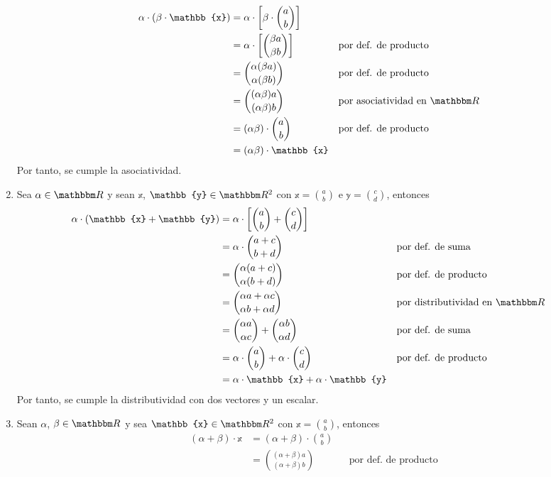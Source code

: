 \begin{example}
\begin{enumerate}[label=\roman*)]
        \begin{align*}
            \alpha \cdot (\beta \cdot \mathbb{x}) & = \alpha \cdot \left[ \beta \cdot \binom{a}{b} \right] \\
            & = \alpha \cdot \left[ \binom{\beta a}{\beta b} \right] && \text{por def. de producto} \\
            & = \binom{\alpha (\beta a)}{\alpha (\beta b)} && \text{por def. de producto} \\
            & = \binom{(\alpha\beta)a}{(\alpha\beta)b} && \text{por asociatividad en $\RR$} \\
            & = (\alpha\beta) \cdot \binom{a}{b} && \text{por def. de producto} \\
            & = (\alpha\beta) \cdot \mathbb{x}
        \end{align*}
        Por tanto, se cumple la asociatividad.
        \item Sea $\alpha \in \RR$ y sean $\mathbb{x}$, $\mathbb{y} \in \RR[2]$ con $\displaystyle \mathbb{x} = \binom{a}{b}$ e $\displaystyle \mathbb{y} = \binom{c}{d}$, entonces
        \begin{align*}
            \alpha \cdot (\mathbb{x} + \mathbb{y}) & = \alpha \cdot \left[ \binom{a}{b} + \binom{c}{d} \right] \\
            & = \alpha \cdot \binom{a+c}{b+d} && \text{por def. de suma} \\
            & = \binom{\alpha (a+c)}{\alpha (b+d)} && \text{por def. de producto} \\
            & = \binom{\alpha a + \alpha c}{\alpha b + \alpha d} && \text{por distributividad en $\RR$} \\
            & = \binom{\alpha a}{\alpha c} + \binom{\alpha b}{\alpha d} && \text{por def. de suma} \\
            & = \alpha \cdot \binom{a}{b} + \alpha \cdot \binom{c}{d} && \text{por def. de producto} \\
            & = \alpha \cdot \mathbb{x} + \alpha \cdot \mathbb{y}
        \end{align*}
        Por tanto, se cumple la distributividad con dos vectores y un escalar.
        \item Sean $\alpha$, $\beta \in \RR$ y sea $\mathbb{x} \in \RR[2]$ con $\displaystyle \mathbb{x} = \binom{a}{b}$, entonces
        \begin{align*}
            (\alpha + \beta) \cdot \mathbb{x} & = (\alpha + \beta) \cdot \binom{a}{b} \\
            & = \binom{(\alpha+\beta)a}{(\alpha+\beta)b} && \text{por def. de producto} \\

\end{align*}
\end{enumerate}
\end{example}
